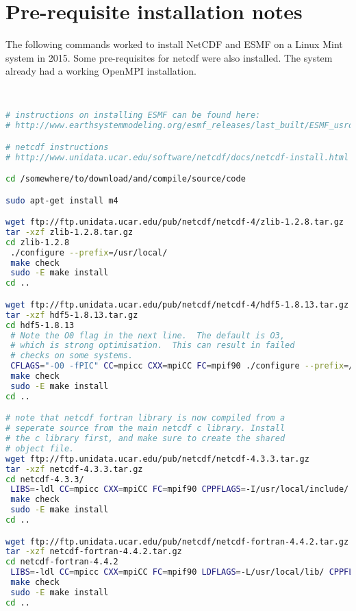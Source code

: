 \documentclass[12pt]{article}
\begin{document}
\appendix

\section{Pre-requisite installation notes}
\label{app:A}
The following commands worked to install NetCDF and ESMF on a Linux Mint system in 2015.
Some pre-requisites for netcdf were also installed.
The system already had a working OpenMPI installation.



\begin{lstlisting}[language=bash]


# instructions on installing ESMF can be found here:
# http://www.earthsystemmodeling.org/esmf_releases/last_built/ESMF_usrdoc/node9.html

# netcdf instructions
# http://www.unidata.ucar.edu/software/netcdf/docs/netcdf-install.html

cd /somewhere/to/download/and/compile/source/code

sudo apt-get install m4

wget ftp://ftp.unidata.ucar.edu/pub/netcdf/netcdf-4/zlib-1.2.8.tar.gz
tar -xzf zlib-1.2.8.tar.gz 
cd zlib-1.2.8
 ./configure --prefix=/usr/local/
 make check
 sudo -E make install
cd ..

wget ftp://ftp.unidata.ucar.edu/pub/netcdf/netcdf-4/hdf5-1.8.13.tar.gz	
tar -xzf hdf5-1.8.13.tar.gz 
cd hdf5-1.8.13
 # Note the O0 flag in the next line.  The default is O3, 
 # which is strong optimisation.  This can result in failed 
 # checks on some systems.
 CFLAGS="-O0 -fPIC" CC=mpicc CXX=mpiCC FC=mpif90 ./configure --prefix=/usr/local/ --with-zlib=/usr/local  --enable-fortran --enable-parallel --enable-shared
 make check
 sudo -E make install
cd ..

# note that netcdf fortran library is now compiled from a 
# seperate source from the main netcdf c library. Install 
# the c library first, and make sure to create the shared
# object file. 
wget ftp://ftp.unidata.ucar.edu/pub/netcdf/netcdf-4.3.3.tar.gz
tar -xzf netcdf-4.3.3.tar.gz 
cd netcdf-4.3.3/
 LIBS=-ldl CC=mpicc CXX=mpiCC FC=mpif90 CPPFLAGS=-I/usr/local/include/ LDFLAGS=-L/usr/local/lib/  ./configure --prefix=/usr/local --enable-parallel 
 make check
 sudo -E make install
cd ..

wget ftp://ftp.unidata.ucar.edu/pub/netcdf/netcdf-fortran-4.4.2.tar.gz
tar -xzf netcdf-fortran-4.4.2.tar.gz 
cd netcdf-fortran-4.4.2
 LIBS=-ldl CC=mpicc CXX=mpiCC FC=mpif90 LDFLAGS=-L/usr/local/lib/ CPPFLAGS="-I/usr/local/include -DUSE_NETCDF4"  ./configure --prefix=/usr/local
 make check
 sudo -E make install
cd ..


\end{lstlisting}
\end{document}
